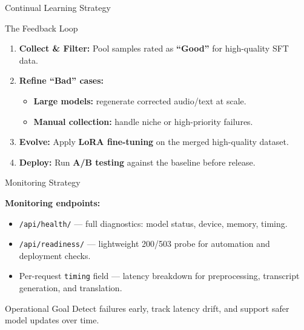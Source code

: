 \documentclass{beamer}
\begin{document}
\begin{frame}[t]{Continual Learning Strategy}
\small

\begin{block}{The Feedback Loop}
\begin{enumerate}\setlength{\itemsep}{4pt}
    \item \textbf{Collect \& Filter:}
    Pool samples rated as \textbf{``Good''} for high-quality SFT data.

    \item \textbf{Refine ``Bad'' cases:}
    \begin{itemize}\setlength{\itemsep}{2pt}
        \item \textbf{Large models:} regenerate corrected audio/text at scale.
        \item \textbf{Manual collection:} handle niche or high-priority failures.
    \end{itemize}

    \item \textbf{Evolve:}
    Apply \textbf{LoRA fine-tuning} on the merged high-quality dataset.

    \item \textbf{Deploy:}
    Run \textbf{A/B testing} against the baseline before release.
\end{enumerate}
\end{block}

\end{frame}

\begin{frame}[t]{Monitoring Strategy}
\small

\textbf{Monitoring endpoints:}
\begin{itemize}\setlength{\itemsep}{5pt}
    \item \texttt{/api/health/} --- full diagnostics:
    model status, device, memory, timing.

    \item \texttt{/api/readiness/} --- lightweight 200/503 probe
    for automation and deployment checks.

    \item Per-request \texttt{timing} field --- latency breakdown for
    preprocessing, transcript generation, and translation.
\end{itemize}

\vspace{6pt}
\begin{block}{Operational Goal}
Detect failures early, track latency drift, and support safer model updates
over time.
\end{block}

\end{frame}
\end{document}
